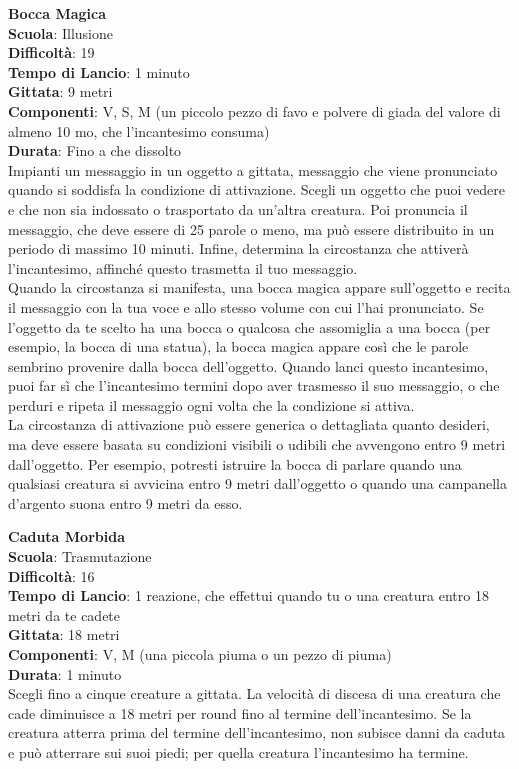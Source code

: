 \begin{multicols}{2}
\medskip\textbf{Bocca Magica}\\
\textbf{Scuola}: Illusione\\
\textbf{Difficoltà}: 19\\
\textbf{Tempo di Lancio}: 1 minuto\\
\textbf{Gittata}: 9 metri\\
\textbf{Componenti}: V, S, M (un piccolo pezzo di favo e polvere di giada del valore di almeno 10 mo, che l'incantesimo consuma)\\
\textbf{Durata}: Fino a che dissolto\\
Impianti un messaggio in un oggetto a gittata, messaggio che viene pronunciato quando si soddisfa la condizione di attivazione. Scegli un oggetto che puoi vedere e che non sia indossato o trasportato da un'altra creatura. Poi pronuncia il messaggio, che deve essere di 25 parole o meno, ma può essere distribuito in un periodo di massimo 10 minuti. Infine, determina la circostanza che attiverà l'incantesimo, affinché questo trasmetta il tuo messaggio.\\
Quando la circostanza si manifesta, una bocca magica appare sull'oggetto e recita il messaggio con la tua voce e allo stesso volume con cui l'hai pronunciato. Se l'oggetto da te scelto ha una bocca o qualcosa che assomiglia a una bocca (per esempio, la bocca di una statua), la bocca magica appare così che le parole sembrino provenire dalla bocca dell'oggetto. Quando lanci questo incantesimo, puoi far sì che l'incantesimo termini dopo aver trasmesso il suo messaggio, o che perduri e ripeta il messaggio ogni volta che la condizione si attiva.\\
La circostanza di attivazione può essere generica o dettagliata quanto desideri, ma deve essere basata su condizioni visibili o udibili che avvengono entro 9 metri dall'oggetto. Per esempio, potresti istruire la bocca di parlare quando una qualsiasi creatura si avvicina entro 9 metri dall'oggetto o quando una campanella d'argento suona entro 9 metri da esso.

\medskip\textbf{Caduta Morbida}\\
\textbf{Scuola}: Trasmutazione\\
\textbf{Difficoltà}: 16\\
\textbf{Tempo di Lancio}: 1 reazione, che effettui quando tu o una creatura entro 18 metri da te cadete\\
\textbf{Gittata}: 18 metri\\
\textbf{Componenti}: V, M (una piccola piuma o un pezzo di piuma)\\
\textbf{Durata}: 1 minuto\\
Scegli fino a cinque creature a gittata. La velocità di discesa di una creatura che cade diminuisce a 18 metri per round fino al termine dell'incantesimo. Se la creatura atterra prima del termine dell'incantesimo, non subisce danni da caduta e può atterrare sui suoi piedi; per quella creatura l'incantesimo ha termine.\\


\end{multicols}
